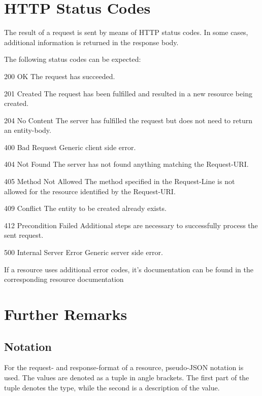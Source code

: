 \documentclass[10pt,a4paper]{scrartcl}
\begin{document}
\pagebreak


\section{HTTP Status Codes}

The result of a request is sent by means of HTTP status codes. In some
cases, additional information is returned in the response body.

The following status codes can be expected:

\begin{description*}
	\item[200 OK] The request has succeeded.
	\item[201 Created] The request has been fulfilled and resulted in a new
		resource being created.
	\item[204 No Content] The server has fulfilled the request but does not need
		to return an entity-body.
	\item[400 Bad Request] Generic client side error.
	\item[404 Not Found] The server has not found anything matching the
		Request-URI.
	\item[405 Method Not Allowed] The method specified in the Request-Line is not
		allowed for the resource identified by the Request-URI.
	\item[409 Conflict] The entity to be created already exists.
	\item[412 Precondition Failed] Additional steps are necessary to successfully
		process the sent request.
	\item[500 Internal Server Error] Generic server side error.
\end{description*}

If a resource uses additional error codes, it's documentation can be found in the corresponding resource documentation

\pagebreak


\section{Further Remarks}

\subsection{Notation}

For the request- and response-format of a resource, pseudo-JSON notation is
used. The values are denoted as a tuple in angle brackets. The first part of the
tuple denotes the type, while the second is a description of the value.
\end{document}
